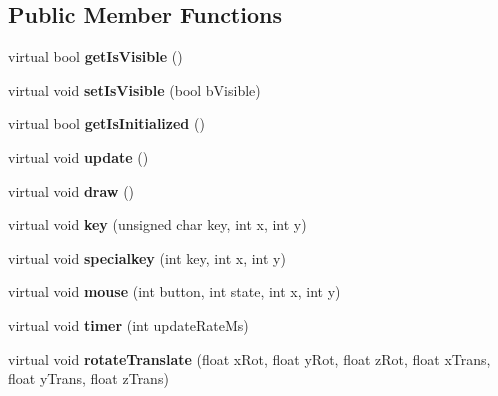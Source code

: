 \subsection*{Public Member Functions}
\begin{DoxyCompactItemize}
\item 
virtual bool {\bfseries get\-Is\-Visible} ()\label{classSoundfieldViewer_1_1RenderObjectBase_ae8da7fe2346c5a9b14e83d95acf1e753}

\item 
virtual void {\bfseries set\-Is\-Visible} (bool b\-Visible)\label{classSoundfieldViewer_1_1RenderObjectBase_ae5580dbb26ed490fb22cc26c1b273330}

\item 
virtual bool {\bfseries get\-Is\-Initialized} ()\label{classSoundfieldViewer_1_1RenderObjectBase_a67edaeb8590ccef00301decaa2198cd1}

\item 
virtual void {\bfseries update} ()\label{classSoundfieldViewer_1_1RenderObjectBase_a8af93452d3b16d1b1f3ce5861433c06b}

\item 
virtual void {\bfseries draw} ()\label{classSoundfieldViewer_1_1RenderObjectBase_a4c85d0f6fb7af11d5d3053fe6b723286}

\item 
virtual void {\bfseries key} (unsigned char key, int x, int y)\label{classSoundfieldViewer_1_1RenderObjectBase_aef2143c0919948dfc4a9f3e7e628d95a}

\item 
virtual void {\bfseries specialkey} (int key, int x, int y)\label{classSoundfieldViewer_1_1RenderObjectBase_a056ee49132beec80c14f6d39e805aea7}

\item 
virtual void {\bfseries mouse} (int button, int state, int x, int y)\label{classSoundfieldViewer_1_1RenderObjectBase_a01e8d2a42bec65cd61279fdd90bc5014}

\item 
virtual void {\bfseries timer} (int update\-Rate\-Ms)\label{classSoundfieldViewer_1_1RenderObjectBase_a9687c99672f9f2a628bafed7e06e3670}

\item 
virtual void {\bfseries rotate\-Translate} (float x\-Rot, float y\-Rot, float z\-Rot, float x\-Trans, float y\-Trans, float z\-Trans)\label{classSoundfieldViewer_1_1RenderObjectBase_a6ac5face2c41c40971bf93f6340de562}

\end{DoxyCompactItemize}
